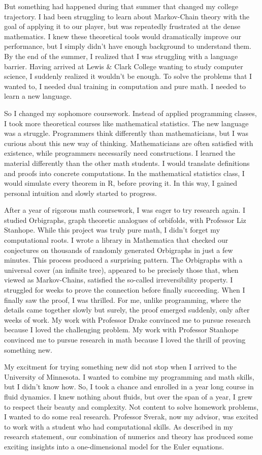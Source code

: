 \documentclass[12pt]{article}
\begin{document}
But something had happened during that summer that changed my college trajectory. I had been struggling to learn about Markov-Chain theory with the goal of applying it to our player, but was repeatedly frustrated at the dense mathematics. I knew these theoretical tools would dramatically improve our performance, but I simply didn't have enough background to understand them. By the end of the summer, I realized that I was struggling with a language barrier. Having arrived at Lewis \& Clark College wanting to study computer science, I suddenly realized it wouldn't be enough. To solve the problems that I wanted to, I needed dual training in computation and pure math. I needed to learn a new language.

So I changed my sophomore coursework. Instead of applied programming classes, I took more theoretical courses like mathematical statistics. The new language was a struggle. Programmers think differently than mathematicians, but I was curious about this new way of thinking. Mathematicians are often satisfied with existence, while programmers necessarily need constructions. I learned the material differently than the other math students. I would translate definitions and proofs into concrete computations. In the mathematical statistics class, I would simulate every theorem in R, before proving it. In this way, I gained personal intuition and slowly started to progress.

After a year of rigorous math coursework, I was eager to try research again. I studied Orbigraphs, graph theoretic analogues of orbifolds, with Professor Liz Stanhope. While this project was truly pure math, I didn't forget my computational roots. I wrote a library in Mathematica that checked our conjectures on thousands of randomly generated Orbigraphs in just a few minutes. This process produced a surprising pattern. The Orbigraphs with a universal cover (an infinite tree), appeared to be precisely those that, when viewed as Markov-Chains, satisfied the so-called irreversibility property. I struggled for weeks to prove the connection before finally succeeding. When I finally saw the proof, I was thrilled. For me, unlike programming, where the details came together slowly but surely, the proof emerged suddenly, only after weeks of work. My work with Professor Drake convinced me to pursue research because I loved the challenging problem. My work with Professor Stanhope convinced me to pursue research in math because I loved the thrill of proving something new.

My excitment for trying something new did not stop when I arrived to the University of Minnesota. I wanted to combine my programming and math skills, but I didn't know how. So, I took a chance and enrolled in a year long course in fluid dynamics. I knew nothing about fluids, but over the span of a year, I grew to respect their beauty and complexity. Not content to solve homework problems, I wanted to do some real research. Professor Sverak, now my advisor, was excited to work with a student who had computational skills. As described in my research statement, our combination of numerics and theory has produced some exciting insights into a one-dimensional model for the Euler equations.
\end{document}
